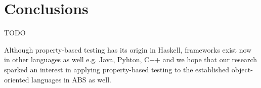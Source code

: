 \section{Conclusions}
\label{sec:conclusions}

TODO

Although property-based testing has its origin in Haskell, frameworks exist now in other languages as well e.g. Java, Pyhton, C++ and we hope that our research sparked an interest in applying property-based testing to the established object-oriented languages in ABS as well. 